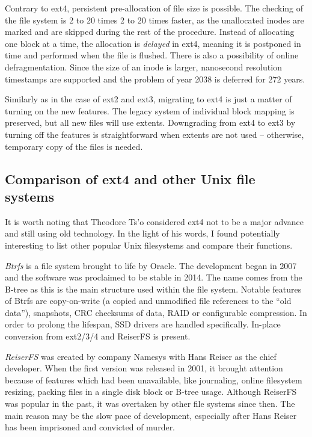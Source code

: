 \documentclass{acm_proc_article-sp}
\begin{document}
Contrary to ext4, persistent pre-allocation of file size is possible. The checking of the file system is 2 to 20 times 2 to 20 times faster, as the unallocated inodes are marked and are skipped during the rest of the procedure. Instead of allocating one block at a time, the allocation is {\it delayed} in ext4, meaning it is postponed in time and performed when the file is flushed. There is also a possibility of online defragmentation. Since the size of an inode is larger, nanosecond resolution timestamps are supported and the problem of year 2038 is deferred for 272 years.

Similarly as in the case of ext2 and ext3, migrating to ext4 is just a matter of turning on the new features. The legacy system of individual block mapping is preserved, but all new files will use extents. Downgrading from ext4 to ext3 by turning off the features is straightforward when extents are not used -- otherwise, temporary copy of the files is needed.

\subsection{Comparison of ext4 and other Unix file systems}

It is worth noting that Theodore Ts'o considered ext4 not to be a major advance and still using old technology. In the light of his words, I found potentially interesting to list other popular Unix filesystems and compare their functions.

{\it Btrfs} \cite{btrfs} is a file system brought to life by Oracle. The development began in 2007 and the software was proclaimed to be stable in 2014. The name comes from the B-tree as this is the main structure used within the file system. Notable features of Btrfs are copy-on-write (a copied and unmodified file references to the ``old data''), snapshots, CRC checksums of data, RAID or configurable compression. In order to prolong the lifespan, SSD drivers are handled specifically. In-place conversion from ext2/3/4 and ReiserFS is present.

{\it ReiserFS} was created by company Namesys with Hans Reiser as the chief developer. When the first version was released in 2001, it brought attention because of features which had been unavailable, like journaling, online filesystem resizing, packing files in a single disk block or B-tree usage. Although ReiserFS was popular in the past, it was overtaken by other file systems since then. The main reason may be the slow pace of development, especially after Hans Reiser has been imprisoned and convicted of murder.
\end{document}
